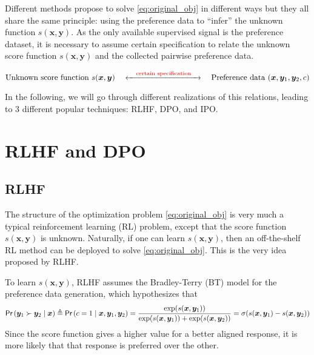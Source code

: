\documentclass[11pt,a4paper]{article}
\begin{document}
Different methods propose to solve \eqref{eq:original_obj} in different ways but they all share the same principle: using the preference data to ``infer'' the unknown function $s(\bm{x}, \bm{y})$.
As the only available supervised signal is the preference dataset, it is necessary to assume certain specification to relate the unknown score function $s(\bm{x}, \bm{y})$ and the collected pairwise preference data.
\begin{tcolorbox}[center]
    \begin{equation}
        \label{eq:general_spec}
\text{Unknown score function } s(\bm{x}, \bm{y}) \quad \xleftrightarrow{\quad \text{\color{red}certain specification}\quad } \quad \text{Preference data } (\bm{x}, \bm{y}_1, \bm{y}_2, c)
    \end{equation} 
\end{tcolorbox}
In the following, we will go through different realizations of this relations, leading to 3 different popular techniques: RLHF, DPO, and IPO.

\section{RLHF and DPO}%
\label{sec:rlhf_and_dpo}
\subsection{RLHF}%
\label{sub:rlhf}
The structure of the optimization problem \eqref{eq:original_obj} is very much a typical reinforcement learning (RL) problem, except that the score function $s(\bm{x}, \bm{y})$ is unknown. 
Naturally, if one can learn $s(\bm{x}, \bm{y})$, then an off-the-shelf RL method can be deployed to solve \eqref{eq:original_obj}. This is the very idea proposed by RLHF.

To learn $s(\bm{x}, \bm{y})$, RLHF assumes the Bradley-Terry (BT) model \cite{bradley1952rank} for the preference data generation, which hypothesizes that
\begin{equation*}
\textsf{Pr}\left(\bm{y}_1 \succ \bm{y}_2 \mid \bm{x}\right) \triangleq \textsf{Pr}\left(c=1 \mid \bm{x}, \bm{y}_{1}, \bm{y}_{2}\right) = \dfrac{\exp(s(\bm{x}, \bm{y}_{1}))}{\exp(s(\bm{x}, \bm{y}_{1})) + \exp(s(\bm{x}, \bm{y}_{2}))}
= \sigma(s(\bm{x}, \bm{y}_{1}) - s(\bm{x}, \bm{y}_{2}))
\end{equation*} 
Since the score function gives a higher value for a better aligned response, it is more likely that that response is preferred over the other.
\end{document}
